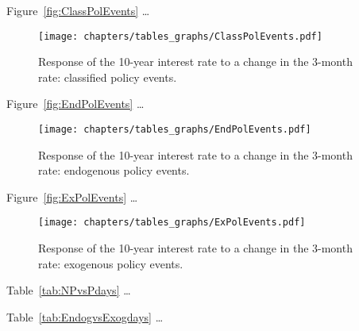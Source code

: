 
Figure~\vref{fig:ClassPolEvents} \dots
\begin{figure}[htbp]
	\centering
		\texttt{[image: chapters/tables\_graphs/ClassPolEvents.pdf]} 
	\caption{Response of the 10-year interest rate to a change in the 3-month rate: classified policy events.}
\label{fig:ClassPolEvents}
\end{figure}
%

Figure~\vref{fig:EndPolEvents} \dots
\begin{figure}[htbp]
	\centering
	\texttt{[image: chapters/tables\_graphs/EndPolEvents.pdf]} 
	\caption{Response of the 10-year interest rate to a change in the 3-month rate: endogenous policy events.}
	\label{fig:EndPolEvents}
\end{figure}
%

Figure~\vref{fig:ExPolEvents} \dots
\begin{figure}[htbp]
	\centering
	\texttt{[image: chapters/tables\_graphs/ExPolEvents.pdf]} 
	\caption{Response of the 10-year interest rate to a change in the 3-month rate: exogenous policy events.}
	\label{fig:ExPolEvents}
\end{figure}
%

Table~\vref{tab:NPvsPdays} \dots 

%

Table~\vref{tab:EndogvsExogdays} \dots 

%
